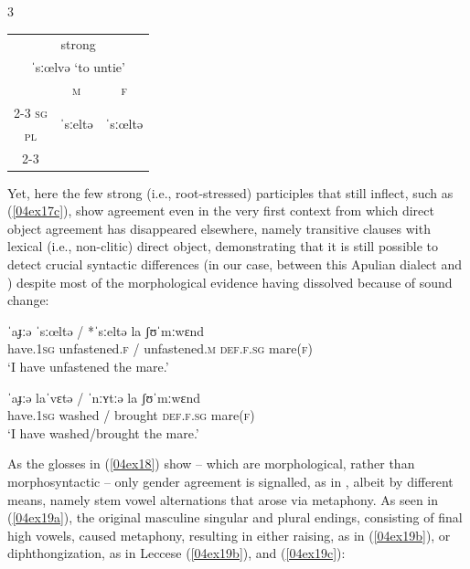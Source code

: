 \documentclass[output=paper,colorlinks,citecolor=brown]{langscibook}
\begin{document}
\begin{minipage}{\textwidth}
\begin{exe}
\begin{minipage}{\dimexpr\textwidth}
\begin{multicols}{3}
\begin{xlist}
					\ex \label{04ex17c}
					\begin{tabularx}{\linewidth}{ccc}
						\multicolumn{3}{c}{strong} \\
						\multicolumn{3}{c}{ˈsːœlvə ‘to untie’} \\
						& \textsc{m} & \textsc{f} \\
						\cline{2-3}
						\textsc{sg} & \multicolumn{1}{|c|}{\multirow{2}{*}{ˈsːeltə}} & \multicolumn{1}{c|}{\multirow{2}{*}{ˈsːœltə}} \\
						\textsc{pl} & \multicolumn{1}{|c|}{} & \multicolumn{1}{c|}{} \\
						\cline{2-3}
					\end{tabularx}
				\end{xlist}
			\end{multicols}
		\end{minipage}
	\end{exe}
\end{minipage}

\bigskip
\bigskip

Yet, here the few strong (i.e., root-stressed) participles that still inflect, such as (\ref{04ex17c}), show agreement even in the very first context from which direct object agreement has disappeared elsewhere, namely transitive clauses with lexical (i.e., non-clitic) direct object, demonstrating that it is still possible to detect crucial syntactic differences (in our case, between this Apulian dialect and ) despite most of the morphological evidence having dissolved because of sound change:

\begin{exe}
	\ex \label{04ex18} 
	\begin{xlist}
		\ex 
		\gll ˈaɟːə ˈsːœltə / *ˈsːeltə la ʃʊˈmːwɛnd \\
		have.\textsc{1sg} unfastened.\textsc{f} / unfastened.\textsc{m} \textsc{def.f.sg} mare(\textsc{f}) \\
		\trans ‘I have unfastened the mare.’
		
		\ex 
		\gll ˈaɟːə laˈvɛtə / ˈnːʏtːə la ʃʊˈmːwɛnd \\
		have.\textsc{1sg} washed / brought \textsc{def.f.sg} mare(\textsc{f}) \\
		\trans ‘I have washed/brought the mare.’
	\end{xlist}
\end{exe}

\largerpage
As the glosses in (\ref{04ex18}) show -- which are morphological, rather than morphosyntactic -- only gender agreement is signalled, as in , albeit by different means, namely stem vowel alternations that arose via metaphony. As seen in (\ref{04ex19a}), the original masculine singular and plural endings, consisting of final high vowels, caused metaphony, resulting in either raising, as in  (\ref{04ex19b}), or diphthongization, as in Leccese (\ref{04ex19b}),  and  (\ref{04ex19c}):
\end{document}
